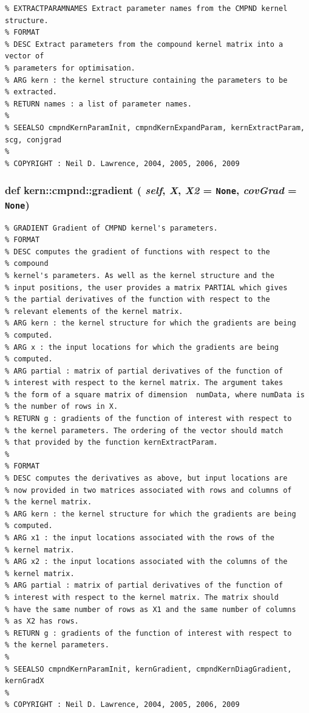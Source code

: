 \footnotesize\begin{verbatim}% EXTRACTPARAMNAMES Extract parameter names from the CMPND kernel structure.
% FORMAT
% DESC Extract parameters from the compound kernel matrix into a vector of
% parameters for optimisation.
% ARG kern : the kernel structure containing the parameters to be
% extracted.
% RETURN names : a list of parameter names.
%
% SEEALSO cmpndKernParamInit, cmpndKernExpandParam, kernExtractParam, scg, conjgrad
%
% COPYRIGHT : Neil D. Lawrence, 2004, 2005, 2006, 2009

\end{verbatim}
\normalsize
 \hypertarget{classkern_1_1cmpnd_bae88f1fa7e84fa6d7651313460d35fc}{
\subsubsection[{gradient}]{\setlength{\rightskip}{0pt plus 5cm}def kern::cmpnd::gradient ( {\em self}, \/   {\em X}, \/   {\em X2} = {\tt None}, \/   {\em covGrad} = {\tt None})}}
\label{classkern_1_1cmpnd_bae88f1fa7e84fa6d7651313460d35fc}




\footnotesize\begin{verbatim}% GRADIENT Gradient of CMPND kernel's parameters.
% FORMAT
% DESC computes the gradient of functions with respect to the
% compound
% kernel's parameters. As well as the kernel structure and the
% input positions, the user provides a matrix PARTIAL which gives
% the partial derivatives of the function with respect to the
% relevant elements of the kernel matrix. 
% ARG kern : the kernel structure for which the gradients are being
% computed.
% ARG x : the input locations for which the gradients are being
% computed. 
% ARG partial : matrix of partial derivatives of the function of
% interest with respect to the kernel matrix. The argument takes
% the form of a square matrix of dimension  numData, where numData is
% the number of rows in X.
% RETURN g : gradients of the function of interest with respect to
% the kernel parameters. The ordering of the vector should match
% that provided by the function kernExtractParam.
%
% FORMAT
% DESC computes the derivatives as above, but input locations are
% now provided in two matrices associated with rows and columns of
% the kernel matrix. 
% ARG kern : the kernel structure for which the gradients are being
% computed.
% ARG x1 : the input locations associated with the rows of the
% kernel matrix.
% ARG x2 : the input locations associated with the columns of the
% kernel matrix.
% ARG partial : matrix of partial derivatives of the function of
% interest with respect to the kernel matrix. The matrix should
% have the same number of rows as X1 and the same number of columns
% as X2 has rows.
% RETURN g : gradients of the function of interest with respect to
% the kernel parameters.
%
% SEEALSO cmpndKernParamInit, kernGradient, cmpndKernDiagGradient, kernGradX
%
% COPYRIGHT : Neil D. Lawrence, 2004, 2005, 2006, 2009

\end{verbatim}
\normalsize
 

